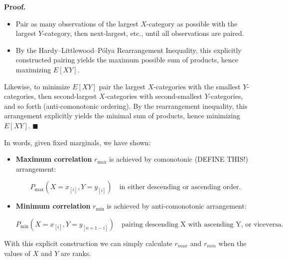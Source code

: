 \documentclass[
  12pt,
]{article}
\theoremstyle{plain}
\theoremstyle{definition}
\renewenvironment{proof}
   {\par\noindent\textbf{Proof.}\ }
   {\hfill$\blacksquare$\par}
\theoremstyle{remark}
\begin{document}
\begin{proof}
\begin{itemize}
\item
  Pair as many observations of the largest \(X\)-category as possible
  with the largest \(Y\)-category, then next-largest, etc., until all
  observations are paired.
\item
  By the Hardy--Littlewood--Pólya Rearrangement Inequality, this
  explicitly constructed pairing yields the maximum possible sum of
  products, hence maximizing \(E[XY]\).
\end{itemize}

Likewise, to minimize \(E[XY]\) pair the largest \(X\)-categories with
the smallest \(Y\)-categories, then second-largest \(X\)-categories with
second-smallest \(Y\)-categories, and so forth (anti-comonotonic
ordering). By the rearrangement inequality, this arrangement explicitly
yields the minimal sum of products, hence minimizing \(E[XY]\).
\end{proof}

In words, given fixed marginals, we have shown:

\begin{itemize}
\item
  \textbf{Maximum correlation} \(r_{\text{max}}\) is achieved by
  comonotonic (DEFINE THIS!) arrangement:

  \[P_{\text{max}}(X=x_{[i]}, Y=y_{[i]}) \quad\text{in either descending or ascending order.}\]
\item
  \textbf{Minimum correlation} \(r_{\text{min}}\) is achieved by
  anti-comonotonic arrangement:

  \[P_{\text{min}}(X=x_{[i]}, Y=y_{[n+1-i]}) \quad\text{pairing descending X with ascending Y, or viceversa.}\]
\end{itemize}

With this explicit construction we can simply calculate \(r_{max}\) and
\(r_{min}\) when the values of \(X\) and \(Y\) are ranks.
\end{document}

